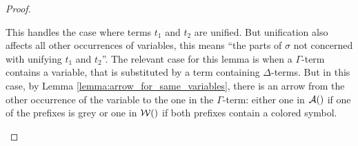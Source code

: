\documentclass[,%
	paper=a4,%
	DIV14, 
	liststotoc,
	bibtotoc,
	draft=false,%
	numbers=noendperiod
]{scrartcl}
\begin{document}
\begin{proof}
\begin{itemize}
\begin{enumerate}
					This handles the case where terms $t_1$ and $t_2$ are unified. 
					But unification also affects all other occurrences of variables, this means ``the parts of $\sigma$ not concerned with unifying $t_1$ and $t_2$''.
					The relevant case for this lemma is when a $\Gamma$-term contains a variable, that is substituted by a term containing $\Delta$-terms.
					But in this case, by Lemma \ref{lemma:arrow_for_same_variables}, there is an arrow from the other occurrence of the variable to the one in the $\Gamma$-term: either one in $\arr$ if one of the prefixes is grey or one in $\warr$ if both prefixes contain a colored symbol.




			\end{enumerate}

	\end{itemize}


\end{proof}
\end{document}

